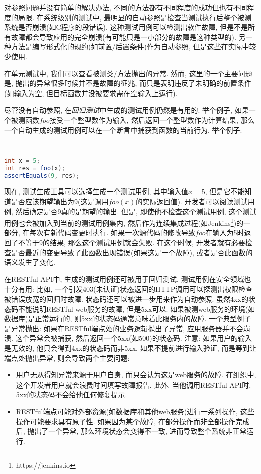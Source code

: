   对参照问题并没有简单的解决办法, 不同的方法都有不同程度的成功但也有不同程度的局限. 在系统级别的测试中, 最明显的自动参照是检查当测试执行后整个被测系统是否崩溃(如C程序的段错误). 这种测试用例可以检测出软件故障, 但是不是所有故障都会导致应用的完全崩溃(有可能只是一小部分的故障是这种类型的). 另一种方法是编写形式化的规约(如前置/后置条件)作为自动参照, 但是这些在实际中较少使用. 
        
  在单元测试中, 我们可以查看被测类/方法抛出的异常. 然而, 这里的一个主要问题是, 抛出的异常很多时候并不是故障的征兆, 而只是表明违反了未明确的前置条件(如输入为空, 但目标函数并没被要求需在空输入上运行). 
        
  尽管没有自动参照, 在\textit{回归测试}中生成的测试用例仍然是有用的. 举个例子, 如果一个被测函数$foo$接受一个整型数作为输入, 然后返回一个整型数作为计算结果, 那么一个自动生成的测试用例可以在一个断言中捕获到函数的当前行为, 举个例子: 
        
    {
        \tt
        \small
        \begin{lstlisting}[language=java]
int x = 5;
int res = foo(x);
assertEquals(9, res);
    \end{lstlisting}
    }
        
    现在, 测试生成工具可以选择生成一个测试用例, 其中输入值$x = 5$, 但是它不能知道是否应该期望输出为9(这是调用$foo(x)$的实际返回值). 开发者可以阅读测试用例, 然后确定是否9真的是期望的输出. 但是, 即使他不检查这个测试用例, 这个测试用例也会被加入到当前的测试用例集内, 然后作为连续集成过程(如Jenkins\footnote{https://jenkins.io})的一部分, 在每次有新代码变更时执行. 如果一次源代码的修改导致$foo$在输入为5时返回了不等于9的结果, 那么这个测试用例就会失败. 在这个时候, 开发者就有必要检查是否最近的变更导致了此函数出现错误(如果这是一个故障), 或者是否此函数的语义发生了变化.
        
    在RESTful API中, 生成的测试用例还可被用于回归测试. 测试用例在安全领域也十分有用: 比如, 一个引发403(未认证)状态返回的HTTP调用可以探测出权限检查被错误放宽的回归时故障. 状态码还可以被进一步用来作为自动参照. 虽然4xx的状态码不能说明RESTful web服务的故障, 但是5xx可以. 如果被测web服务的环境(如数据库)是正常运行的, 则5xx的状态码通常意味着此服务内的故障. 一个典型例子是异常抛出: 如果在RESTful端点处的业务逻辑抛出了异常, 应用服务器并不会崩溃. 这个异常会被捕获, 然后返回一个5xx(如500)的状态码. 注意: 如果用户的输入是无效的, 他只会得到4xx的状态码而非5xx. 如果不提前进行输入验证, 而是等到让端点处抛出异常, 则会导致两个主要问题: 
    \begin{itemize}
    \item 用户无从得知异常来源于用户自身, 而只会认为这是web服务的故障. 在组织中, 这个开发者用户就会浪费时间填写故障报告. 此外, 当他调用RESTful API时, 5xx的状态码不会给他任何修复提示. 
        
      \item RESTful端点可能对外部资源(如数据库和其他web服务)进行一系列操作, 这些操作可能要求具有原子性. 如果因为某个故障, 在部分操作而非全部操作完成后, 抛出了一个异常, 那么环境状态会变得不一致, 进而导致整个系统非正常运行.
  \end{itemize}
    
